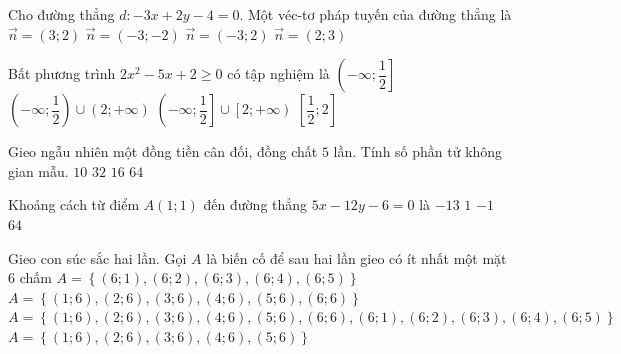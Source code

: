 \begin{ex}%
	Cho đường thẳng $d\colon-3x+2y-4=0$. Một véc-tơ pháp tuyến của đường thẳng là
	\choice
	{$\overrightarrow{n}=\left(3;2\right)$}
	{$\overrightarrow{n}=\left(-3;-2\right)$}
	{\True $\overrightarrow{n}=\left(-3;2\right)$}
	{$\overrightarrow{n}=\left(2;3\right)$}
\end{ex}
\begin{ex}%
	Bất phương trình $2x^2-5x+2\geq 0$ có tập nghiệm là
	\choice
	{$\left(-\infty;\dfrac{1}{2} \right]$}
	{$\left(-\infty;\dfrac{1}{2}\right)\cup \left(2;+\infty \right)$}
	{\True $\left(-\infty;\dfrac{1}{2}\right]\cup \left[2;+\infty    \right)$}
	{$\left[\dfrac{1}{2};2\right]$}
	\loigiai{
		Ta có $2x^2-5x+2\geq 0\Leftrightarrow\hoac{&x\geq2\\&x\leq \dfrac{1}{2}.}$\\ Vậy tập nghiệm của phương trình là $S=\left(-\infty;\dfrac{1}{2}\right]\cup \left[2;+\infty \right)$.
	}
\end{ex}
\begin{ex}%
	Gieo ngẫu nhiên một đồng tiền cân đối, đồng chất $5$ lần. Tính số phần tử không gian mẫu.
	\choice
	{$10$}
	{\True $32$}
	{$16$}
	{$64$}
\end{ex}
\begin{ex}%
	Khoảng cách từ điểm $A(1;1)$ đến đường thẳng $5x-12y-6=0$ là
	\choice
	{$-13$}
	{\True $1$}
	{$-1$}
	{$64$}
\end{ex}
\begin{ex}%
	Gieo con súc sắc hai lần. Gọi $A$ là biến cố để sau hai lần gieo có ít nhất một mặt $6$ chấm
	\choice
	{$A=\left\{\left(6;1\right),\left(6;2\right),\left(6;3\right),\left(6;4\right),\left(6;5\right)\right\}$}
	{$A=\left\{\left(1;6\right),\left(2;6\right),\left(3;6\right),\left(4;6\right),\left(5;6\right),\left(6;6\right)\right\}$}
	{\True $A=\left\{\left(1;6\right),\left(2;6\right),\left(3;6\right),\left(4;6\right),\left(5;6\right),\left(6;6\right),\left(6;1\right),\left(6;2\right),\left(6;3\right),\left(6;4\right),\left(6;5\right)\right\}$}
	{$A=\left\{\left(1;6\right),\left(2;6\right),\left(3;6\right),\left(4;6\right),\left(5;6\right)\right\}$}
\end{ex}
